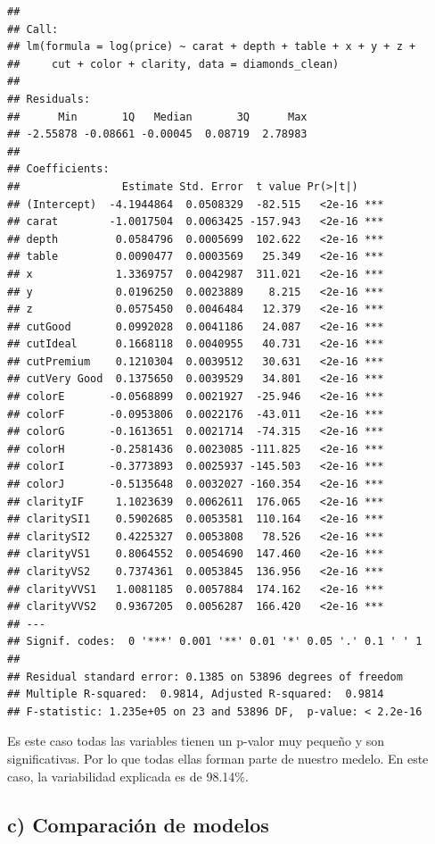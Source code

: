 \documentclass[
  spanish,
]{article}
\begin{document}
\begin{verbatim}
## 
## Call:
## lm(formula = log(price) ~ carat + depth + table + x + y + z + 
##     cut + color + clarity, data = diamonds_clean)
## 
## Residuals:
##      Min       1Q   Median       3Q      Max 
## -2.55878 -0.08661 -0.00045  0.08719  2.78983 
## 
## Coefficients:
##                Estimate Std. Error  t value Pr(>|t|)    
## (Intercept)  -4.1944864  0.0508329  -82.515   <2e-16 ***
## carat        -1.0017504  0.0063425 -157.943   <2e-16 ***
## depth         0.0584796  0.0005699  102.622   <2e-16 ***
## table         0.0090477  0.0003569   25.349   <2e-16 ***
## x             1.3369757  0.0042987  311.021   <2e-16 ***
## y             0.0196250  0.0023889    8.215   <2e-16 ***
## z             0.0575450  0.0046484   12.379   <2e-16 ***
## cutGood       0.0992028  0.0041186   24.087   <2e-16 ***
## cutIdeal      0.1668118  0.0040955   40.731   <2e-16 ***
## cutPremium    0.1210304  0.0039512   30.631   <2e-16 ***
## cutVery Good  0.1375650  0.0039529   34.801   <2e-16 ***
## colorE       -0.0568899  0.0021927  -25.946   <2e-16 ***
## colorF       -0.0953806  0.0022176  -43.011   <2e-16 ***
## colorG       -0.1613651  0.0021714  -74.315   <2e-16 ***
## colorH       -0.2581436  0.0023085 -111.825   <2e-16 ***
## colorI       -0.3773893  0.0025937 -145.503   <2e-16 ***
## colorJ       -0.5135648  0.0032027 -160.354   <2e-16 ***
## clarityIF     1.1023639  0.0062611  176.065   <2e-16 ***
## claritySI1    0.5902685  0.0053581  110.164   <2e-16 ***
## claritySI2    0.4225327  0.0053808   78.526   <2e-16 ***
## clarityVS1    0.8064552  0.0054690  147.460   <2e-16 ***
## clarityVS2    0.7374361  0.0053845  136.956   <2e-16 ***
## clarityVVS1   1.0081185  0.0057884  174.162   <2e-16 ***
## clarityVVS2   0.9367205  0.0056287  166.420   <2e-16 ***
## ---
## Signif. codes:  0 '***' 0.001 '**' 0.01 '*' 0.05 '.' 0.1 ' ' 1
## 
## Residual standard error: 0.1385 on 53896 degrees of freedom
## Multiple R-squared:  0.9814, Adjusted R-squared:  0.9814 
## F-statistic: 1.235e+05 on 23 and 53896 DF,  p-value: < 2.2e-16
\end{verbatim}

Es este caso todas las variables tienen un p-valor muy pequeño y son
significativas. Por lo que todas ellas forman parte de nuestro medelo.
En este caso, la variabilidad explicada es de 98.14\%.

\subsection*{c) Comparación de
modelos}\label{c-comparaciuxf3n-de-modelos}
\end{document}
